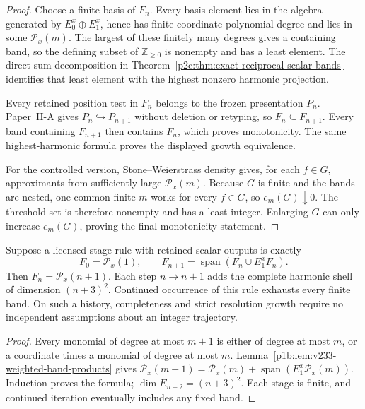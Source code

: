 \documentclass[12pt,a4paper]{article}
\begin{document}
\begin{proof}
Choose a finite basis of \(F_n\).  Every basis element lies in the algebra
generated by \(E_0^x\oplus E_1^x\), hence has finite coordinate-polynomial
degree and lies in some \(\mathcal P_x(m)\).  The largest of these finitely
many degrees gives a containing band, so the defining subset of
\(\mathbb Z_{\ge0}\) is nonempty and has a least element.  The direct-sum
decomposition in
Theorem~\ref{p2c:thm:exact-reciprocal-scalar-bands} identifies that least
element with the highest nonzero harmonic projection.

Every retained position test in \(F_n\) belongs to the frozen presentation
\(P_n\).  Paper~II-A gives \(P_n\hookrightarrow P_{n+1}\) without deletion
or retyping, so \(F_n\subseteq F_{n+1}\).  Every band containing
\(F_{n+1}\) then contains \(F_n\), which proves monotonicity.  The same
highest-harmonic formula proves the displayed growth equivalence.

For the controlled version, Stone--Weierstrass density gives, for each
\(f\in G\), approximants from sufficiently large \(\mathcal P_x(m)\).
Because \(G\) is finite and the bands are nested, one common finite \(m\)
works for every \(f\in G\), so \(e_m(G)\downarrow0\).  The threshold set is
therefore nonempty and has a least integer.  Enlarging \(G\) can only increase
\(e_m(G)\), proving the final monotonicity statement.
\end{proof}


\begin{theorem}
\label{p2c:thm:v233-stagewise-band-growth}
Suppose a licensed stage rule with retained scalar outputs is exactly
\[
 F_0=\mathcal P_x(1),\qquad
 F_{n+1}=\operatorname{span}(F_n\cup E_1^xF_n).
\]
Then \(F_n=\mathcal P_x(n+1)\). Each step \(n\to n+1\) adds the
complete harmonic shell of dimension \((n+3)^2\).
Continued occurrence of this rule exhausts every finite band.
On such a history, completeness and strict resolution growth require
no independent assumptions about an integer trajectory.
\end{theorem}
\begin{proof}
Every monomial of degree at most \(m+1\) is either of degree at most
\(m\), or a coordinate times a monomial of degree at most \(m\).
Lemma~\ref{p1b:lem:v233-weighted-band-products} gives
\(\mathcal P_x(m+1)=\mathcal P_x(m)+
\operatorname{span}(E_1^x\mathcal P_x(m))\).
Induction proves the formula; \(\dim E_{n+2}=(n+3)^2\).
Each stage is finite, and continued iteration eventually includes
any fixed band.
\end{proof}
\end{document}

